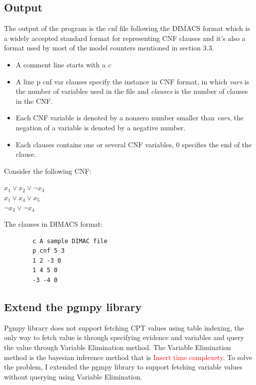     \subsection{Output}
    The output of the program is the cnf file following the DIMACS format which is a widely accepted standard format for representing CNF clauses and it's also a format used by most of the model counters mentioned in section 3.3.\\
    \begin{itemize}
        \item A comment line starts with a \textit{c}
        \item A line p cnf var clauses specify the instance in CNF format, in which \textit{vars} is the number of variables used in the file and \textit{clauses} is the number of clauses in the CNF.
        \item Each CNF variable is denoted by a non\-zero number smaller than \textit{vars}, the negation of a variable is denoted by a negative number.
        \item Each clauses contains one or several CNF variables, 0 specifies the end of the clause.
    \end{itemize}
    
    Consider the following CNF:
    \begin{center}
        $x_{1} \vee x_{2} \vee \neg x_{3}$\\
        $x_{1} \vee x_{4} \vee x_{5}$\\
        $\neg x_{3} \vee \neg x_{4}$\\  
    \end{center}
    The clauses in DIMACS format:
    \begin{center}
        \begin{lstlisting}
        c A sample DIMAC file
        p cnf 5 3
        1 2 -3 0
        1 4 5 0
        -3 -4 0
        \end{lstlisting}
    \end{center}
    
    \subsection{Extend the pgmpy library}
    Pgmpy library does not support fetching CPT values using table indexing, the only way to fetch value is through specifying evidence and variables and query the value through Variable Elimination method. The Variable Elimination method is the bayesian inference method that is \textcolor{red}{Insert time complexety}. To solve the problem, I extended the pgmpy library to support fetching variable values without querying using Variable Elimination.\\

